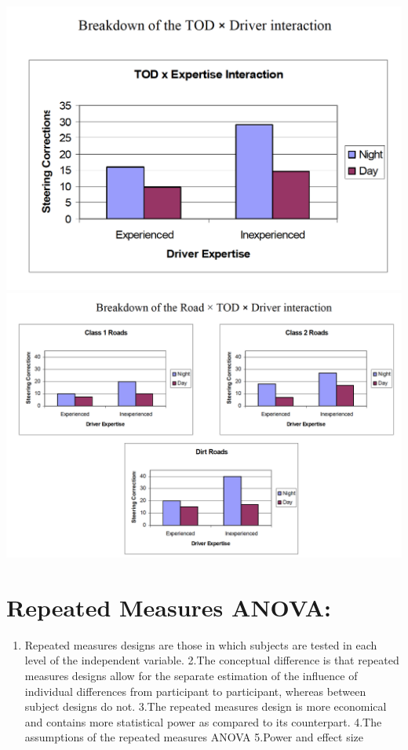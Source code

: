 \documentclass[]{book}
\providecommand{\tightlist}{%
  \setlength{\itemsep}{0pt}\setlength{\parskip}{0pt}}
\theoremstyle{definition}
\theoremstyle{definition}
\theoremstyle{definition}
\theoremstyle{remark}
\begin{document}
\includegraphics{img/hicksfa33.png} \includegraphics{img/hicksfa34.png}

\chapter{Repeated Measures ANOVA:}\label{repeated-measures-anova}

\begin{enumerate}
\def\labelenumi{\arabic{enumi}.}
\tightlist
\item
  Repeated measures designs are those in which subjects are tested in
  each level of the independent variable. 2.The conceptual difference is
  that repeated measures designs allow for the separate estimation of
  the influence of individual differences from participant to
  participant, whereas between subject designs do not. 3.The repeated
  measures design is more economical and contains more statistical power
  as compared to its counterpart. 4.The assumptions of the repeated
  measures ANOVA 5.Power and effect size
\end{enumerate}
\end{document}
